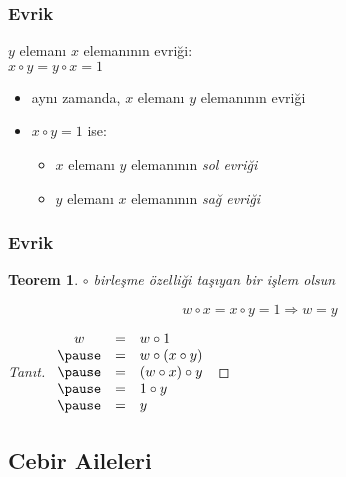 \documentclass[dvipsnames]{beamer}
\theoremstyle{definition}
\theoremstyle{example}
\theoremstyle{plain}
\newtheorem{teorem}[theorem]{Teorem}
\begin{document}
\begin{frame}
  \frametitle{Evrik}

  \begin{definition}
    $y$ elemanı $x$ elemanının \alert{evriği}:\\
    $x \circ y = y \circ x = 1$

    \begin{itemize}
      \item aynı zamanda, $x$ elemanı $y$ elemanının evriği
    \end{itemize}
  \end{definition}

  \pause
  \begin{itemize}
    \item $x \circ y = 1$ ise:
    \begin{itemize}
      \item $x$ elemanı $y$ elemanının \emph{sol evriği}
      \item $y$ elemanı $x$ elemanının \emph{sağ evriği}
    \end{itemize}
  \end{itemize}
\end{frame}

\begin{frame}
  \frametitle{Evrik}

  \begin{teorem}
    $\circ$ birleşme özelliği taşıyan bir işlem olsun

    \[ w \circ x = x \circ y = 1 \Rightarrow w = y \]
  \end{teorem}

  \pause
  \begin{proof}[Tanıt]
    $\begin{array}{ccl}
      w & = & w \circ 1\\ \pause
        & = & w \circ (x \circ y)\\ \pause
        & = & (w \circ x) \circ y\\ \pause
        & = & 1 \circ y\\ \pause
        & = & y
    \end{array}$
  \end{proof}
\end{frame}

\subsection{Cebir Aileleri}
\end{document}

